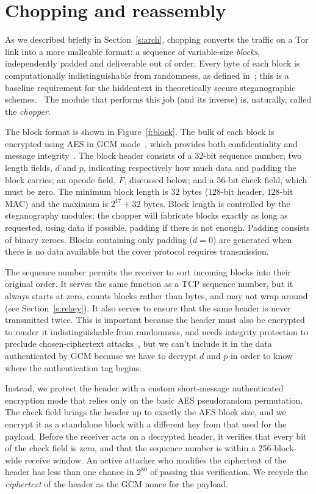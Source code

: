 \section{Chopping and reassembly}\label{s:chop}



As we described briefly in Section~\ref{s:arch}, chopping converts the
traffic on a Tor link into a more malleable format: a sequence of
variable-size \emph{blocks}, independently padded and deliverable out
of order.  Every byte of each block is computationally
indistinguishable from randomness, as defined in~\cite{s-noncephil};
this is a baseline requirement for the hiddentext in theoretically
secure steganographic schemes.~\cite{s-ah-pssteg,s-ah-pksteg}  The
module that performs this job (and its inverse) is, naturally, called
the \emph{chopper}.

The block format is shown in Figure~\ref{f:block}.  The bulk of each
block is encrypted using AES in GCM mode~\cite{s-gcm}, which provides
both confidentiality and message integrity~\cite{s-authenc}.  The
block header consists of a 32-bit sequence number; two length fields,
$d$ and $p$, indicating respectively how much data and padding the
block carries; an opcode field, $F$, discussed below; and a 56-bit
check field, which must be zero.  The minimum block length is $32$
bytes ($128$-bit header, $128$-bit MAC) and the maximum is $2^{17} +
32$ bytes.  Block length is controlled by the steganography modules;
the chopper will fabricate blocks exactly as long as requested, using
data if possible, padding if there is not enough.  Padding consists of
binary zeroes.  Blocks containing only padding ($d=0$) are generated
when there is no data available but the cover protocol requires
transmission.

The sequence number permits the receiver to sort incoming blocks into
their original order.  It serves the same function as a TCP sequence
number, but it always starts at zero, counts blocks rather than bytes,
and may not wrap around (see Section~\ref{s:rekey}).  It also serves
to ensure that the same header is never transmitted twice.  This is
important because the header must also be encrypted to render it
indistinguishable from randomness, and needs integrity protection to
preclude chosen-ciphertext attacks~\cite{a-padding-oracle,a-ssh-plaintext},
but we can't include it in the data authenticated by GCM because we
have to decrypt $d$ and $p$ in order to know where the authentication
tag begins.

Instead, we protect the header with a custom short-message
authenticated encryption mode that relies only on the basic AES
pseudorandom permutation.  The check field brings the header up to
exactly the AES block size, and we encrypt it as a standalone block
with a different key from that used for the payload.  Before the
receiver acts on a decrypted header, it verifies that every bit of the
check field is zero, and that the sequence number is within a
256-block-wide receive window.  An active attacker who modifies the
ciphertext of the header has less than one chance in $2^{80}$ of
passing this verification.  We recycle the \emph{ciphertext} of the
header as the GCM nonce for the payload.

